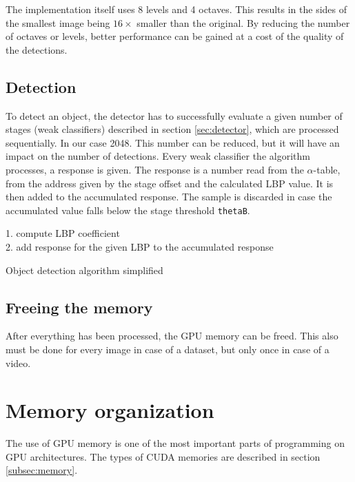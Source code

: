 The implementation itself uses 8 levels and 4 octaves. This results in the sides of the smallest image being $16 \times$ smaller than the original. By reducing the number of octaves or levels, better performance can be gained at a cost of the quality of the detections.

\subsection{Detection}

To detect an object, the detector has to successfully evaluate a given number of stages (weak classifiers) described in section \ref{sec:detector}, which are processed sequentially. In our case 2048. This number can be reduced, but it will have an impact on the number of detections. Every weak classifier the algorithm processes, a response is given. The response is a number read from the $\alpha$-table, from the address given by the stage offset and the calculated LBP value. It is then added to the accumulated response. The sample is discarded in case the accumulated value falls below the stage threshold \verb|thetaB|.

\begin{algorithm} \label{alg:detection}
{
	{
		1. compute LBP coefficient \\
		2. add response for the given LBP to the accumulated response \\
	}
}

\caption{Object detection algorithm simplified}
\end{algorithm}

\subsection{Freeing the memory}\label{subsec:free}

After everything has been processed, the GPU memory can be freed. This also must be done for every image in case of a dataset, but only once in case of a video.

\section{Memory organization} \label{sec:memory-organization}

The use of GPU memory is one of the most important parts of programming on GPU architectures. The types of CUDA memories are described in section \ref{subsec:memory}.

